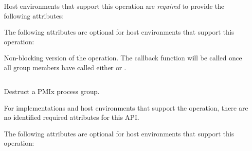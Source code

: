 Host environments that support this operation are \textit{required} to provide the following attributes:


\reqattrend

\optattrstart
The following attributes are optional for host environments that support this operation:


\optattrend

\descr

Non-blocking version of the  operation. The callback function will be called once all group members have called either  or .

\subsection{}

\summary

Destruct a \ac{PMIx} process group.

\format


\begin{arglist}
\end{arglist}

\returnsimple

\reqattrstart
For implementations and host environments that support the operation, there are no identified required
attributes for this \ac{API}.
\reqattrend

\optattrstart
The following attributes are optional for host environments that support this operation:

